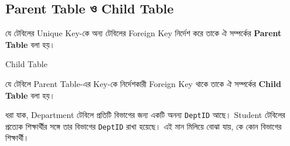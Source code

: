 
\subsection{Parent Table ও Child Table}

\begin{definitionbox}{}

যে টেবিলের Unique Key-কে অন্য টেবিলের Foreign Key নির্দেশ করে
তাকে ঐ সম্পর্কের \textbf{Parent Table} বলা হয়।

\end{definitionbox}

\begin{definitionbox}{Child Table}

যে টেবিলে Parent Table-এর Key-কে নির্দেশকারী Foreign Key থাকে
তাকে ঐ সম্পর্কের \textbf{Child Table} বলা হয়।

\end{definitionbox}


ধরা যাক, Department টেবিলে প্রতিটি বিভাগের জন্য একটি অনন্য \texttt{DeptID} আছে। Student টেবিলের প্রত্যেক শিক্ষার্থীর সঙ্গে তার বিভাগের \texttt{DeptID} রাখা হয়েছে। এই মান মিলিয়ে বোঝা যায়, কে কোন বিভাগের শিক্ষার্থী।


